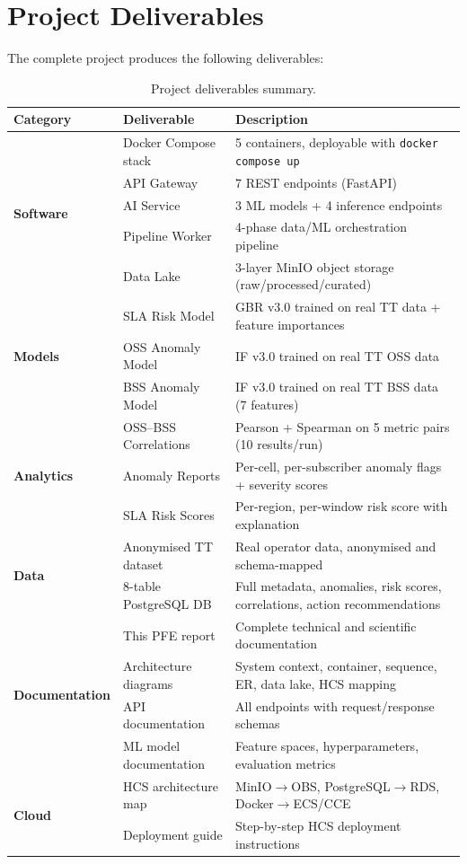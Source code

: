 \section{Project Deliverables}

The complete project produces the following deliverables:

\begin{table}[H]
\centering
\caption{Project deliverables summary.}
\label{tab:deliverables}
\begin{tabularx}{\textwidth}{@{}llX@{}}
\toprule
\textbf{Category} & \textbf{Deliverable} & \textbf{Description} \\
\midrule
\multirow{5}{*}{\textbf{Software}} 
  & Docker Compose stack & 5 containers, deployable with \texttt{docker compose up} \\
  & API Gateway          & 7 REST endpoints (FastAPI) \\
  & AI Service           & 3 ML models + 4 inference endpoints \\
  & Pipeline Worker      & 4-phase data/ML orchestration pipeline \\
  & Data Lake            & 3-layer MinIO object storage (raw/processed/curated) \\
\midrule
\multirow{3}{*}{\textbf{Models}} 
  & SLA Risk Model       & GBR v3.0 trained on real TT data + feature importances \\
  & OSS Anomaly Model    & IF v3.0 trained on real TT OSS data \\
  & BSS Anomaly Model    & IF v3.0 trained on real TT BSS data (7 features) \\
\midrule
\multirow{3}{*}{\textbf{Analytics}} 
  & OSS--BSS Correlations & Pearson + Spearman on 5 metric pairs (10 results/run) \\
  & Anomaly Reports      & Per-cell, per-subscriber anomaly flags + severity scores \\
  & SLA Risk Scores      & Per-region, per-window risk score with explanation \\
\midrule
\multirow{2}{*}{\textbf{Data}} 
  & Anonymised TT dataset& Real operator data, anonymised and schema-mapped \\
  & 8-table PostgreSQL DB & Full metadata, anomalies, risk scores, correlations, action recommendations \\
\midrule
\multirow{4}{*}{\textbf{Documentation}} 
  & This PFE report      & Complete technical and scientific documentation \\
  & Architecture diagrams & System context, container, sequence, ER, data lake, HCS mapping \\
  & API documentation     & All endpoints with request/response schemas \\
  & ML model documentation & Feature spaces, hyperparameters, evaluation metrics \\
\midrule
\multirow{2}{*}{\textbf{Cloud}} 
  & HCS architecture map  & MinIO$\to$OBS, PostgreSQL$\to$RDS, Docker$\to$ECS/CCE \\
  & Deployment guide      & Step-by-step HCS deployment instructions \\
\bottomrule
\end{tabularx}
\end{table}


